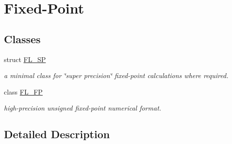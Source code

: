 \hypertarget{group___fixed_point}{}\section{Fixed-\/\+Point}
\label{group___fixed_point}
\subsection*{Classes}
\begin{DoxyCompactItemize}
\item 
struct \hyperlink{struct_f_l___s_p}{F\+L\+\_\+\+SP}
\begin{DoxyCompactList}\small\item\em a minimal class for \char`\"{}super precision\char`\"{} fixed-\/point calculations where required. \end{DoxyCompactList}\item 
class \hyperlink{class_f_l___f_p}{F\+L\+\_\+\+FP}
\begin{DoxyCompactList}\small\item\em high-\/precision unsigned fixed-\/point numerical format. \end{DoxyCompactList}\end{DoxyCompactItemize}


\subsection{Detailed Description}
